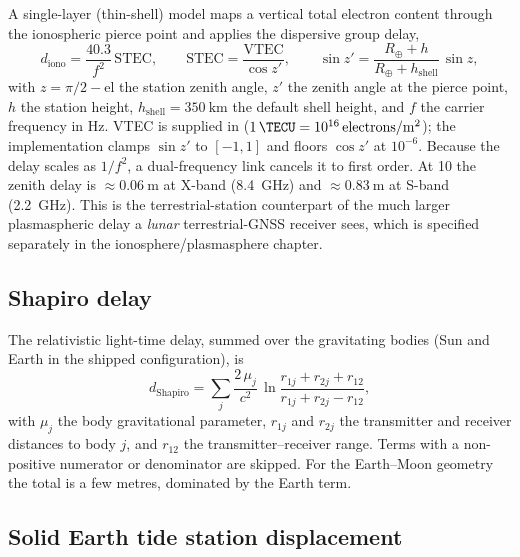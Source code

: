 A single-layer (thin-shell) model maps a vertical total electron content
through the ionospheric pierce point and applies the dispersive group delay,
\begin{equation}
  d_\mathrm{iono} = \frac{40.3}{f^2}\,\mathrm{STEC},
  \qquad
  \mathrm{STEC} = \frac{\mathrm{VTEC}}{\cos z'},
  \qquad
  \sin z' = \frac{R_\oplus + h}{R_\oplus + h_\mathrm{shell}}\,\sin z,
  \label{eq:meas-iono}
\end{equation}
with $z = \pi/2 - \mathrm{el}$ the station zenith angle, $z'$ the zenith angle
at the pierce point, $h$ the station height, $h_\mathrm{shell} =
\SI{350}{\kilo\meter}$ the default shell height, and $f$ the carrier frequency
in \si{\hertz}. VTEC is supplied in \si{\TECU}
($1\,\si{\TECU} = 10^{16}\,\text{electrons}/\si{\meter\squared}$); the
implementation clamps $\sin z'$ to $[-1,1]$ and floors $\cos z'$ at $10^{-6}$.
Because the delay scales as $1/f^2$, a dual-frequency link cancels it to first
order. At \SI{10}{\TECU} the zenith delay is $\approx\SI{0.06}{\meter}$ at
X-band (\SI{8.4}{\giga\hertz}) and $\approx\SI{0.83}{\meter}$ at S-band
(\SI{2.2}{\giga\hertz}). This is the terrestrial-station counterpart of the
much larger plasmaspheric delay a \emph{lunar} terrestrial-GNSS receiver sees,
which is specified separately in the ionosphere/plasmasphere chapter.

\subsection{Shapiro delay}
\label{sec:meas-shapiro}

The relativistic light-time delay, summed over the gravitating bodies (Sun and
Earth in the shipped configuration), is
\begin{equation}
  d_\mathrm{Shapiro}
  = \sum_j \frac{2\,\mu_j}{c^2}\,
    \ln\!\frac{r_{1j} + r_{2j} + r_{12}}{r_{1j} + r_{2j} - r_{12}},
  \label{eq:meas-shapiro}
\end{equation}
with $\mu_j$ the body gravitational parameter, $r_{1j}$ and $r_{2j}$ the
transmitter and receiver distances to body $j$, and $r_{12}$ the
transmitter--receiver range. Terms with a non-positive numerator or
denominator are skipped. For the Earth--Moon geometry the total is a few
metres, dominated by the Earth term.

\subsection{Solid Earth tide station displacement}
\label{sec:meas-tide}

